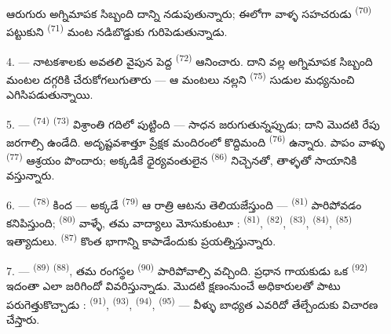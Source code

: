 ఆరుగురు అగ్నిమాపక సిబ్బంది దాన్ని నడుపుతున్నారు; ఈలోగా వాళ్ళ సహచరుడు 
\textsuperscript{(70)} పట్టుకుని  \textsuperscript{(71)} మంట నడిబొడ్డుకు
గురిపెడుతున్నాడు.

4. --- నాటకశాలకు అవతలి వైపున పెద్ద  \textsuperscript{(72)} ఆనించారు.
దాని వల్ల అగ్నిమాపక సిబ్బంది మంటల దగ్గరికి చేరుకోగలుగుతారు — ఆ మంటలు నల్లని
 \textsuperscript{(75)} సుడుల మధ్యనుంచి ఎగిసిపడుతున్నాయి.

\VUsaut{5.0mm}
\VUsaut{3.4mm}

5. ---  \textsuperscript{(74)}  \textsuperscript{(73)}
విశ్రాంతి గదిలో పుట్టింది —  సాధన జరుగుతున్నప్పుడు; దాని మొదటి
 రేపు జరగాల్సి ఉండేది. అదృష్టవశాత్తూ ప్రేక్షక మందిరంలో కొద్దిమంది
 \textsuperscript{(76)} ఉన్నారు. పాపం వాళ్ళు 
\textsuperscript{(77)} ఆశ్రయం పొందారు; అక్కడికే ధైర్యవంతులైన
 \textsuperscript{(86)} నిచ్చెనతో, తాళ్ళతో సాయానికి వస్తున్నారు.

6. ---  \textsuperscript{(78)} కింద — అక్కడే
 \textsuperscript{(79)} ఆ రాత్రి ఆటను తెలియజేస్తుంది —
 \textsuperscript{(81)} పారిపోవడం కనిపిస్తుంది; 
\textsuperscript{(80)} వాళ్ళే, తమ వాద్యాలు మోసుకుంటూ : 
\textsuperscript{(81)},  \textsuperscript{(82)}, 
\textsuperscript{(83)},  \textsuperscript{(84)}, 
\textsuperscript{(85)} ఇత్యాదులు.  \textsuperscript{(87)} కొంత భాగాన్ని
కాపాడేందుకు ప్రయత్నిస్తున్నారు.

7. ---  \textsuperscript{(89)}  \textsuperscript{(88)},
  తమ రంగస్థల 
\textsuperscript{(90)} పారిపోవాల్సి వచ్చింది. ప్రధాన గాయకుడు ఒక
 \textsuperscript{(92)} ఇదంతా ఎలా జరిగిందో వివరిస్తున్నాడు.
 మొదటి క్షణంనుంచే అధికారులతో పాటు పరుగెత్తుకొచ్చాడు :
 \textsuperscript{(91)}, 
\textsuperscript{(93)},  \textsuperscript{(94)},
 \textsuperscript{(95)} — వీళ్ళు బాధ్యత ఎవరిదో తేల్చేందుకు విచారణ
చేస్తారు.

\VUsaut{6.0mm}
\VUfilet{22mm}
